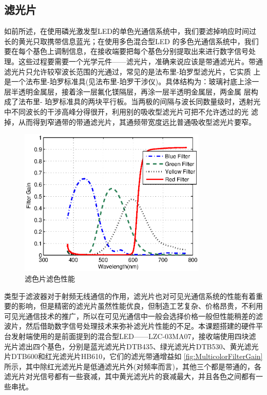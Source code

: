 \subsection{滤光片}
如前所述，在使用磷光激发型LED的单色光通信系统中，我们要滤掉响应时间过长的黄光只取携带信息蓝光；在使用多色混合型LED 的多色光通信系统中，我们要在每个基色上调制信息，在接收端要把每个基色分别提取出来进行数字信号处理。这些过程要需要一个光学元件——滤光片，准确来说应该是带通滤光片。带通滤光片只允许较窄波长范围的光通过，常见的是法布里-珀罗型滤光片，它实质 上是一个法布里-珀罗标准具(见法布里-珀罗干涉仪)。具体结构为：玻璃衬底上涂一层半透明金属层，接着涂一层氟化镁隔层，再涂一层半透明金属层，两金属 层构成了法布里- 珀罗标准具的两块平行板。当两极的间隔与波长同数量级时，透射光中不同波长的干涉高峰分得很开，利用别的吸收型滤光片可把不允许透过的光 滤掉，从而得到窄通带的带通滤光片，其通频带宽度远比普通吸收型滤光片要窄\cite{OpticalFilter}。
\begin{figure}[htbp]
    \centering
    \includegraphics[width=0.8\textwidth]{figures/Chapter-2/MulticolorFilterGain.eps}
    \caption{滤色片滤色性能}
    \label{fig:MulticolorFilterGain}
\end{figure}
类型于滤波器对于射频无线通信的作用，滤光片也对可见光通信系统的性能有着重要的影响，但是精密的滤光片虽然性能优良，但制造工艺复杂、价格昂贵，不利用可见光通信技术的推广，所以在可见光通信中一般会选择价格一般但性能稍差的滤波片，然后借助数字信号处理技术来弥补滤光片性能的不足。本课题搭建的硬件平台发射端使用的是前面提到的混合型LED——LZC-03MA07，接收端使用四块滤光片滤出四个基色，分别是蓝光滤光片DTB435、绿光滤光片DTB530、黄光滤光片DTB600和红光滤光片HB610，它们的滤光带通增益如
\autoref{fig:MulticolorFilterGain}所示，其中除红光滤光片是低通滤光片外(对频率而言)，其他三个都是带通的，各滤光片对光信号都有一些衰减，其中黄光滤光片的衰减最大，并且各色之间都有一些串扰。
